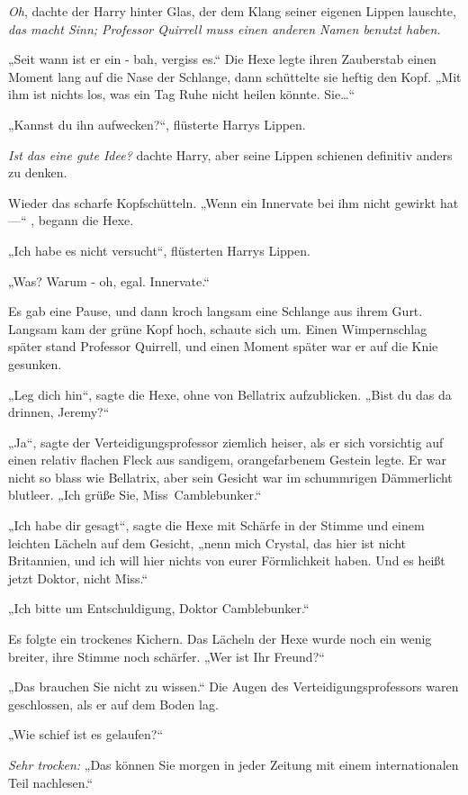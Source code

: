{\emph{Oh}, dachte der Harry hinter Glas, der dem Klang seiner eigenen Lippen lauschte, \emph{das macht Sinn; Professor Quirrell muss einen anderen Namen benutzt haben.}

„Seit wann ist er ein - bah, vergiss es.“ Die Hexe legte ihren Zauberstab einen Moment lang auf die Nase der Schlange, dann schüttelte sie heftig den Kopf. „Mit ihm ist nichts los, was ein Tag Ruhe nicht heilen könnte. Sie…“

„Kannst du ihn aufwecken?“, flüsterte Harrys Lippen.

\emph{Ist das eine gute Idee?} dachte Harry, aber seine Lippen schienen definitiv anders zu denken.

Wieder das scharfe Kopfschütteln. „Wenn ein Innervate bei ihm nicht gewirkt hat—“ , begann die Hexe.

„Ich habe es nicht versucht“, flüsterten Harrys Lippen.

„Was? Warum - oh, egal. Innervate.“

Es gab eine Pause, und dann kroch langsam eine Schlange aus ihrem Gurt. Langsam kam der grüne Kopf hoch, schaute sich um. Einen Wimpernschlag später stand Professor Quirrell, und einen Moment später war er auf die Knie gesunken.

„Leg dich hin“, sagte die Hexe, ohne von Bellatrix aufzublicken. „Bist du das da drinnen, Jeremy?“

„Ja“, sagte der Verteidigungsprofessor ziemlich heiser, als er sich vorsichtig auf einen relativ flachen Fleck aus sandigem, orangefarbenem Gestein legte. Er war nicht so blass wie Bellatrix, aber sein Gesicht war im schummrigen Dämmerlicht blutleer. „Ich grüße Sie, Miss~Camblebunker.“

„Ich habe dir gesagt“, sagte die Hexe mit Schärfe in der Stimme und einem leichten Lächeln auf dem Gesicht, „nenn mich Crystal, das hier ist nicht Britannien, und ich will hier nichts von eurer Förmlichkeit haben. Und es heißt jetzt Doktor, nicht Miss.“

„Ich bitte um Entschuldigung, Doktor Camblebunker.“

Es folgte ein trockenes Kichern. Das Lächeln der Hexe wurde noch ein wenig breiter, ihre Stimme noch schärfer. „Wer ist Ihr Freund?“

„Das brauchen Sie nicht zu wissen.“ Die Augen des Verteidigungsprofessors waren geschlossen, als er auf dem Boden lag.

„Wie schief ist es gelaufen?“

\emph{Sehr trocken:} „Das können Sie morgen in jeder Zeitung mit einem internationalen Teil nachlesen.“

}
